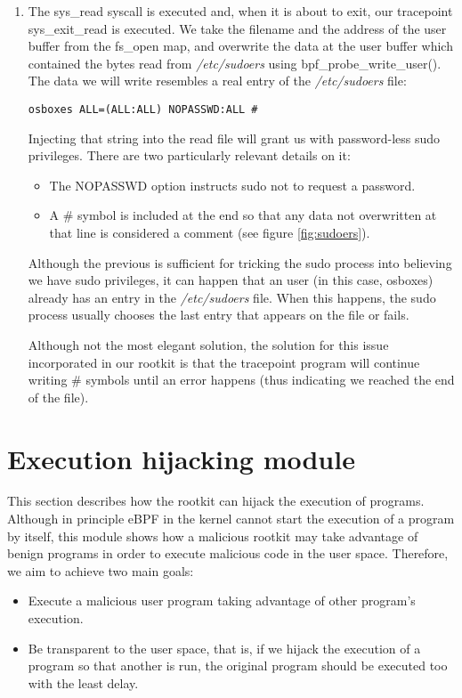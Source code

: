 \begin{enumerate}
\item The sys\_read syscall is executed and, when it is about to exit, our tracepoint sys\_exit\_read is executed. We take the filename and the address of the user buffer from the fs\_open map, and overwrite the data at the user buffer which contained the bytes read from \textit{/etc/sudoers} using bpf\_probe\_write\_user(). The data we will write resembles a real entry of the \textit{/etc/sudoers} file:
\begin{verbatim}
osboxes ALL=(ALL:ALL) NOPASSWD:ALL #
\end{verbatim}

Injecting that string into the read file will grant us with password-less sudo privileges. There are two particularly relevant details on it:
\begin{itemize}
\item The NOPASSWD option instructs sudo not to request a password.
\item A \# symbol is included at the end so that any data not overwritten at that line is considered a comment (see figure \ref{fig:sudoers}).
\end{itemize}

Although the previous is sufficient for tricking the sudo process into believing we have sudo privileges, it can happen that an user (in this case, osboxes) already has an entry in the \textit{/etc/sudoers} file. When this happens, the sudo process usually chooses the last entry that appears on the file or fails. 

Although not the most elegant solution, the solution for this issue incorporated in our rootkit is that the tracepoint program will continue writing \# symbols until an error happens (thus indicating we reached the end of the file).

\end{enumerate}


\section{Execution hijacking module} \label{section:execution_hijack}
This section describes how the rootkit can hijack the execution of programs. Although in principle eBPF in the kernel cannot start the execution of a program by itself, this module shows how a malicious rootkit may take advantage of benign programs in order to execute malicious code in the user space. Therefore, we aim to achieve two main goals:
\begin{itemize}
\item Execute a malicious user program taking advantage of other program's execution.
\item Be transparent to the user space, that is, if we hijack the execution of a program so that another is run, the original program should be executed too with the least delay.
\end{itemize}

